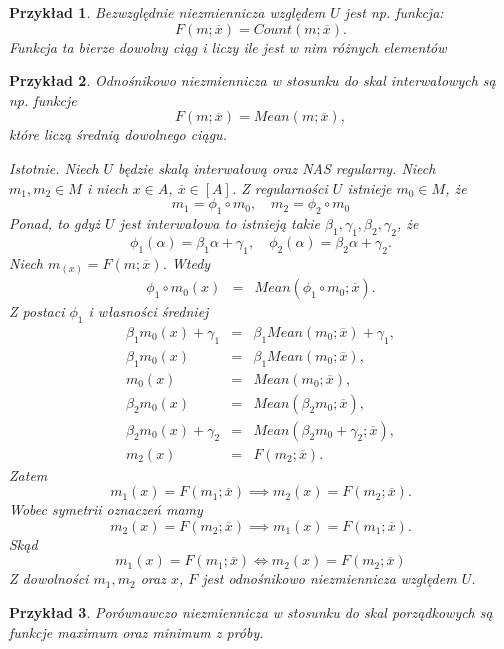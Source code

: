 \documentclass[12pt,a4paper]{report}
\newtheorem{przyklad}{Przykład}
\newcommand{\domkniecie}[1]{\left[ {#1} \right] }
\begin{document}
\begin{przyklad}
Bezwzględnie niezmiennicza względem $U$ jest np. funkcja:
$$
F(m;\overline{x})=Count(m;\overline{x}).
$$
Funkcja ta bierze dowolny ciąg i liczy ile jest w nim różnych elementów
\end{przyklad}
\begin{przyklad}
Odnośnikowo niezmiennicza w stosunku do skal interwałowych są np. funkcje
$$
F(m;\overline{x})=Mean(m;\overline{x}),
$$ 
które liczą średnią dowolnego ciągu.

Istotnie. Niech $U$ będzie skalą interwałową oraz NAS regularny.
Niech $m_1,m_2\in M$ i niech $x \in A $, $\overline{x}\in \domkniecie{A}$. Z regularności $U$ istnieje $m_0 \in M$, że
$$
m_1 = \phi_1 \circ m_0, \quad m_2=\phi_2\circ m_0
$$
Ponad, to gdyż $U$ jest interwałowa to istnieją takie $\beta_{1}, \gamma_{1}, \beta_{2}, \gamma_{2}$, że
$$
\phi_1(\alpha)=\beta_1 \alpha + \gamma_1, \quad \phi_2(\alpha)=\beta_2 \alpha + \gamma_2.
$$
Niech $m_(x)=F(m;\overline{x})$. Wtedy
\begin{eqnarray*}
\phi_1\circ m_0(x) & = & Mean(\phi_1\circ m_0;\overline{x}). 
\end{eqnarray*}
Z postaci $\phi_{1}$ i własności średniej
\begin{eqnarray*}
\beta_1m_0(x)+ \gamma_1 & = & \beta_1 Mean(m_0;\overline{x}) + \gamma_1, \\
\beta_1m_0(x) & = & \beta_1 Mean(m_0;\overline{x}), \\
m_0(x) & = & Mean(m_0;\overline{x}), \\
\beta_2m_0(x) & = & Mean(\beta_2 m_0;\overline{x}), \\
\beta_2m_0(x) + \gamma_2 & = & Mean(\beta_2 m_0 + \gamma_2;\overline{x}),  \\
m_2(x) & = & F(m_2;\overline{x}) .
\end{eqnarray*}
Zatem
$$
m_1(x)=F(m_1;\overline{x}) \implies m_2(x)=F(m_2;\overline{x}).
$$
Wobec symetrii oznaczeń mamy
$$
m_2(x)=F(m_2;\overline{x}) \implies m_1(x)=F(m_1;\overline{x}).
$$
Skąd
$$
m_1(x)=F(m_1;\overline{x}) \iff m_2(x)=F(m_2;\overline{x})
$$
Z dowolności $m_1,m_2$ oraz $x$, $F$ jest odnośnikowo niezmiennicza względem $U$.
\end{przyklad}
\begin{przyklad}
Porównawczo niezmiennicza w stosunku do skal porządkowych są funkcje maximum oraz minimum z próby.
\end{przyklad}
\end{document}
